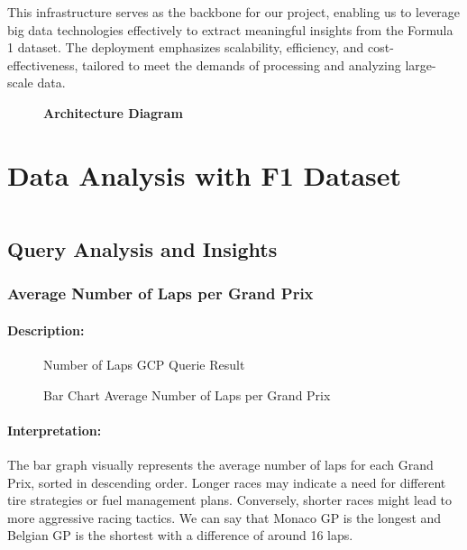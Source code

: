 \documentclass{article}
\begin{document}
This infrastructure serves as the backbone for our project, enabling us to leverage big data technologies effectively to extract meaningful insights from the Formula 1 dataset. The deployment emphasizes scalability, efficiency, and cost-effectiveness, tailored to meet the demands of processing and analyzing large-scale data.

\begin{figure}[H]
    \centering
    \caption{\textbf{Architecture Diagram}}
\end{figure}

\section{Data Analysis with F1 Dataset}

\begin{lstlisting}[language=Python]

\end{lstlisting}

\subsection{Query Analysis and Insights}

\subsubsection{Average Number of Laps per Grand Prix}
\paragraph{Description:}


\begin{figure}[H]
    \centering
    \caption{Number of Laps GCP Querie Result}
\end{figure}

\begin{figure}[H]
    \centering
    \caption{Bar Chart Average Number of Laps per Grand Prix}
\end{figure}

\paragraph{Interpretation:}
The bar graph visually represents the average number of laps for each Grand Prix, sorted in descending order. Longer races may indicate a need for different tire strategies or fuel management plans. Conversely, shorter races might lead to more aggressive racing tactics. We can say that Monaco GP is the longest and Belgian GP is the shortest with a difference of around 16 laps.
\end{document}

